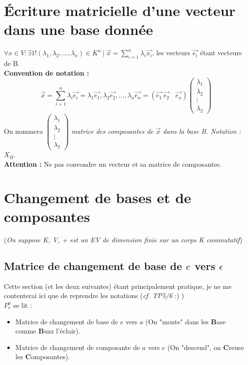 \documentclass[british,french,11pt, a4paper, openany]{book}
\begin{document}
	\section{Écriture matricielle d'une vecteur dans une base donnée}
	$\forall x \in V : \exists 1!(\lambda_{1}, \lambda_{2}, ..., \lambda_{n}) \in K^{n}\ |\ \vec{x} = \sum_{i=1}^{n} \lambda_{i}\vec{x_{i}}$, les vecteurs $\vec{e_{i}}$ étant vecteurs de B.\\
	\textbf{Convention de notation :}\\
	$$\vec{x} = \sum_{i=1}^{n}  \lambda_{i}\vec{e_{i}} = \lambda_{1}\vec{e_{1}}, \lambda_{2}\vec{e_{2}}, ..., \lambda_{n}\vec{e_{n}} = (\vec{e_{1}}\ \vec{e_{2}}\ \ \ \ \vec{e_{n}})\begin{pmatrix} 
	\lambda_1 \\ 
	\lambda_2 \\ 
	\vdots\\ 
	\lambda_2 \end{pmatrix}$$
	On nommera $\begin{pmatrix} 
	\lambda_1 \\ 
	\lambda_2 \\ 
	\vdots\\ 
	\lambda_2 \end{pmatrix}$ \textit{matrice des composantes de $\vec{x}$ dans la base B. Notation : $X_B$}.
	\\
	\textbf{Attention :} Ne pas convondre un vecteur et sa matrice de 
	composantes.
	
	
	\section{Changement de bases et de composantes}
	(\textit{On suppose K, V, + est un EV de dimension finie sur un corps K commutatif})\\
	\subsection{Matrice de changement de base de $e$ vers $\epsilon$}
	Cette section (et les deux suivantes) étant principalement pratique, je ne me contenterai ici que de reprendre les notations (\textit{cf. TP5/6} :) )\\
	$P_e^a$ se lit :
	\begin{itemize}
		\item Matrice de changement de base de $e$ vers $a$ (On "monte" dans les \textbf{B}ase comme \textbf{B}uzz l'éclair).
		\item Matrice de changement de composante de $a$ vers $e$ (On "descend", on \textbf{C}reuse les \textbf{C}omposantes).
	\end{itemize}
\end{document}
